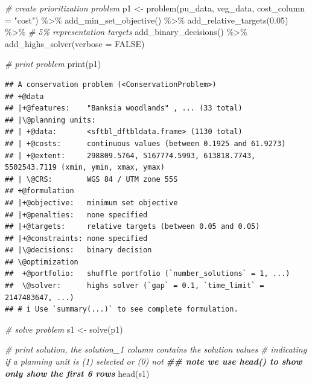 \documentclass[
  12pt,
]{book}
\newenvironment{Shaded}{\begin{snugshade}}{\end{snugshade}}
\newcommand{\AttributeTok}[1]{\textcolor[rgb]{0.77,0.63,0.00}{#1}}
\newcommand{\CommentTok}[1]{\textcolor[rgb]{0.56,0.35,0.01}{\textit{#1}}}
\newcommand{\ConstantTok}[1]{\textcolor[rgb]{0.00,0.00,0.00}{#1}}
\newcommand{\DocumentationTok}[1]{\textcolor[rgb]{0.56,0.35,0.01}{\textbf{\textit{#1}}}}
\newcommand{\FloatTok}[1]{\textcolor[rgb]{0.00,0.00,0.81}{#1}}
\newcommand{\FunctionTok}[1]{\textcolor[rgb]{0.00,0.00,0.00}{#1}}
\newcommand{\NormalTok}[1]{#1}
\newcommand{\OtherTok}[1]{\textcolor[rgb]{0.56,0.35,0.01}{#1}}
\newcommand{\SpecialCharTok}[1]{\textcolor[rgb]{0.00,0.00,0.00}{#1}}
\newcommand{\StringTok}[1]{\textcolor[rgb]{0.31,0.60,0.02}{#1}}
\begin{document}
\begin{Shaded}
\begin{Highlighting}[]
\CommentTok{\# create prioritization problem}
\NormalTok{p1 }\OtherTok{\textless{}{-}}
  \FunctionTok{problem}\NormalTok{(pu\_data, veg\_data, }\AttributeTok{cost\_column =} \StringTok{"cost"}\NormalTok{) }\SpecialCharTok{\%\textgreater{}\%}
  \FunctionTok{add\_min\_set\_objective}\NormalTok{() }\SpecialCharTok{\%\textgreater{}\%}
  \FunctionTok{add\_relative\_targets}\NormalTok{(}\FloatTok{0.05}\NormalTok{) }\SpecialCharTok{\%\textgreater{}\%} \CommentTok{\# 5\% representation targets}
  \FunctionTok{add\_binary\_decisions}\NormalTok{() }\SpecialCharTok{\%\textgreater{}\%}
  \FunctionTok{add\_highs\_solver}\NormalTok{(}\AttributeTok{verbose =} \ConstantTok{FALSE}\NormalTok{)}

\CommentTok{\# print problem}
\FunctionTok{print}\NormalTok{(p1)}
\end{Highlighting}
\end{Shaded}

\begin{verbatim}
## A conservation problem (<ConservationProblem>)
## +@data
## |+@features:    "Banksia woodlands" , ... (33 total)
## |\@planning units:
## | +@data:       <sftbl_dftbldata.frame> (1130 total)
## | +@costs:      continuous values (between 0.1925 and 61.9273)
## | +@extent:     298809.5764, 5167774.5993, 613818.7743, 5502543.7119 (xmin, ymin, xmax, ymax)
## | \@CRS:        WGS 84 / UTM zone 55S
## +@formulation
## |+@objective:   minimum set objective
## |+@penalties:   none specified
## |+@targets:     relative targets (between 0.05 and 0.05)
## |+@constraints: none specified
## |\@decisions:   binary decision
## \@optimization
##  +@portfolio:   shuffle portfolio (`number_solutions` = 1, ...)
##  \@solver:      highs solver (`gap` = 0.1, `time_limit` = 2147483647, ...)
## # i Use `summary(...)` to see complete formulation.
\end{verbatim}

\begin{Shaded}
\begin{Highlighting}[]
\CommentTok{\# solve problem}
\NormalTok{s1 }\OtherTok{\textless{}{-}} \FunctionTok{solve}\NormalTok{(p1)}

\CommentTok{\# print solution, the solution\_1 column contains the solution values}
\CommentTok{\# indicating if a planning unit is (1) selected or (0) not}
\DocumentationTok{\#\# note we use head() to show only show the first 6 rows}
\FunctionTok{head}\NormalTok{(s1)}
\end{Highlighting}
\end{Shaded}
\end{document}
